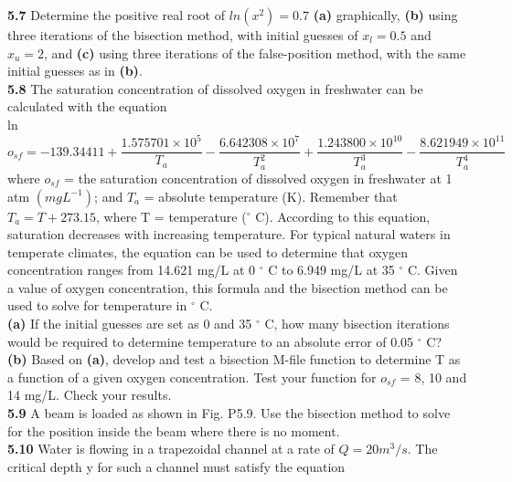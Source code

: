 \documentclass[../main.tex]{subfiles}
\begin{document}
\begin{multicols}{2}
    \noindent\textbf{5.7} Determine the positive real root of $ln(x^2) = 0.7$ \textbf{(a)}
    graphically, \textbf{(b)} using three iterations of the bisection
    method, with initial guesses of $x_l = 0.5$ and $x_u = 2$, and
    \textbf{(c)} using three iterations of the false-position method, with
    the same initial guesses as in \textbf{(b)}.\\

    \noindent\textbf{5.8} The saturation concentration of dissolved oxygen in
    freshwater can be calculated with the equation\\

    \noindent ln$o_{sf}=-139.34411+\dfrac{1.575701\times10^5}{T_a} - \dfrac{6.642308\times 10^7}{T^2_a} +
    \dfrac{1.243800\times 10^{10}}{T^3_a} - \dfrac{8.621949\times 10^{11}}{T^4_a}$\\

    \noindent where $o_{sf}$ = the saturation concentration of dissolved oxygen
    in freshwater at 1 atm $(mg L^{-1})$; and $T_a$ = absolute
    temperature (K). Remember that $T_a = T + 273.15$, where
    T = temperature ($^{\circ}$ C). According to this equation, saturation
    decreases with increasing temperature. For typical natural
    waters in temperate climates, the equation can be used to determine
    that oxygen concentration ranges from 14.621 mg/L
    at 0 $^{\circ}$ C to 6.949 mg/L at 35 $^{\circ}$ C. Given a value of oxygen concentration,
    this formula and the bisection method can be
    used to solve for temperature in $^{\circ}$ C.\\
    \textbf{(a)} If the initial guesses are set as 0 and 35 $^{\circ}$ C, how many
    bisection iterations would be required to determine temperature
    to an absolute error of 0.05 $^{\circ}$ C?\\
    \textbf{(b)} Based on \textbf{(a)}, develop and test a bisection M-file function
    to determine T as a function of a given oxygen concentration.
    Test your function for $o_{sf}$ = 8, 10 and 14 mg/L.
    Check your results.\\

    \noindent\textbf{5.9} A beam is loaded as shown in Fig. P5.9. Use the bisection
    method to solve for the position inside the beam where
    there is no moment.\\

    \noindent\textbf{5.10} Water is flowing in a trapezoidal channel at a rate of
    $Q = 20 m^3/s$. The critical depth y for such a channel must
    satisfy the equation\\


\end{multicols}
\end{document}
